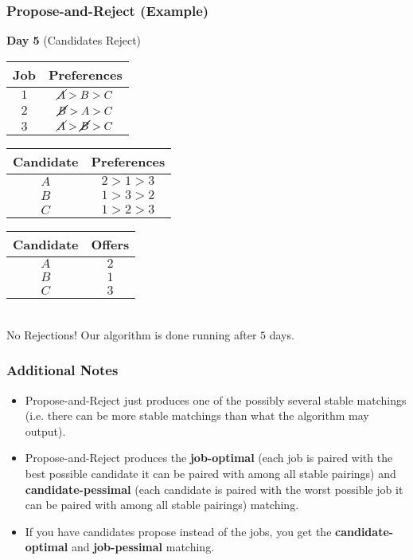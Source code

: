 \documentclass{beamer}
\begin{document}
\begin{frame}
    \frametitle{Propose-and-Reject (Example)}
    {\bf Day 5} (Candidates Reject)
    \begin{center}
        \begin{tabular}{c|c}
            Job & Preferences \\
            \hline
            $1$ & $\cancel{A}>B>C$\\
            $2$ & $\cancel{B}>A>C$\\
            $3$ & $\cancel{A}>\cancel{B}>C$
        \end{tabular}
        \hspace{10pt}
        \begin{tabular}{c|c}
            Candidate & Preferences \\
            \hline
            $A$ & $2>1>3$\\
            $B$ & $1>3>2$\\
            $C$ & $1>2>3$
        \end{tabular}
    \end{center}
    \begin{center}
        \begin{tabular}{c|c}
            Candidate & Offers \\
            \hline
            $A$ & $2$ \\
            $B$ & $1$ \\
            $C$ & $3$
        \end{tabular}\\
        \vspace{10pt}
        No Rejections! Our algorithm is done running after $5$ days.
    \end{center}
\end{frame}

\begin{frame}
    \frametitle{Additional Notes}
    \begin{itemize}
        \item Propose-and-Reject just produces one of the possibly several stable matchings (i.e. there can be more stable matchings than what the algorithm may output).
        \item Propose-and-Reject produces the {\bf job-optimal} (each job is paired with the best possible candidate it can be paired with among all stable pairings) and {\bf candidate-pessimal} (each candidate is paired with the worst possible job it can be paired with among all stable pairings) matching.
        \item If you have candidates propose instead of the jobs, you get the {\bf candidate-optimal} and {\bf job-pessimal} matching.
    \end{itemize}
\end{frame}
\end{document}

